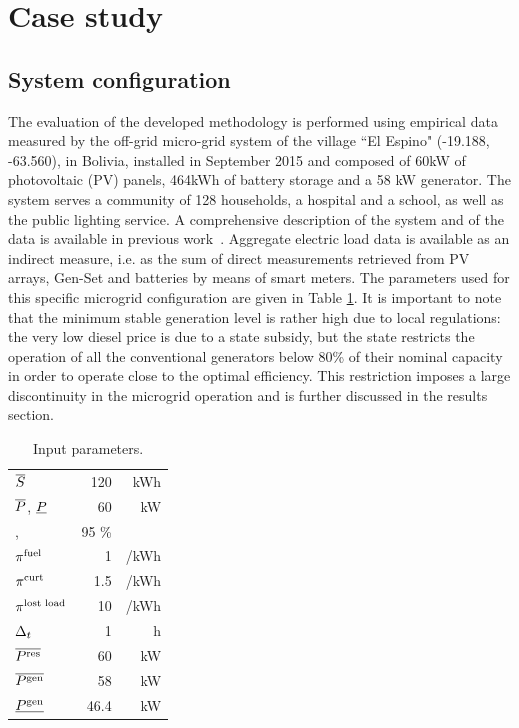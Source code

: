 \documentclass{article}
\begin{document}
\section{Case study}\label{sec: CaseStudy}

\subsection{System configuration}

The evaluation of the developed methodology is performed using empirical data measured by the off-grid micro-grid system of the village ``El Espino" (-19.188, -63.560), in Bolivia, installed in September 2015 and composed of 60kW of photovoltaic (PV) panels, 464kWh of battery storage and a 58 kW generator. The system serves a community of 128 households, a hospital and a school, as well as the public lighting service. A comprehensive description of the system and of the data is available in previous work~\cite{Balderrama2019}. Aggregate electric load data is available as an indirect measure, i.e. as the sum of direct measurements retrieved from PV arrays, Gen-Set and batteries by means of smart meters. 
The parameters used for this specific microgrid configuration are given in Table \ref{input_param}. It is important to note that the minimum stable generation level is rather high due to local regulations: the very low diesel price is due to a state subsidy, but the state restricts the operation of all the conventional generators below 80\% of their nominal capacity in order to operate close to the optimal efficiency. This restriction imposes a large discontinuity in the microgrid operation and is further discussed in the results section.

\begin{table}
	\begin{center}
		\renewcommand\arraystretch{1}
		\caption{Input parameters.}
		\begin{tabular}[b]{l r r}
			\hline
			$\overline{S}$ & 120 & kWh \\
			$\overline{P}$, $\underline{P}$ & 60 & kW \\
			\chargeEfficienty, \dischargeEfficienty & 95 \% \\ 
			$\pi^{\text{fuel}}$ & 1 & \texteuro/kWh\\
			$\pi^{\text{curt}}$ & 1.5 & \texteuro/kWh \\
			$\pi^{\text{lost load}}$ & 10 & \texteuro/kWh \\
			$\Delta_t$ & 1 & h\\
			$\overline{P^\text{res}}$ & 60 & kW \\
			$\overline{P^\text{gen}}$ & 58 & kW \\
			$\underline{P^\text{gen}}$ & 46.4 & kW \\
			\hline
		\end{tabular}
		\label{input_param}
	\end{center}
\end{table}
\end{document}
